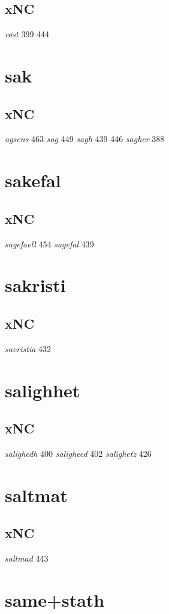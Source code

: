 \documentclass[a4paper,twocolumn]{article}
\begin{document}
\subsection{xNC}
\label{sec:org9426e8e}
\emph{røst} 399 444 
\section{sak}
\label{sec:org3487ff0}
\subsection{xNC}
\label{sec:org9a9e229}
\emph{agsens} 463 \emph{sag} 449 \emph{sagh} 439 446 \emph{sagher} 388 
\section{sakefal}
\label{sec:org0ee5bb6}
\subsection{xNC}
\label{sec:org17df959}
\emph{sagefaell} 454 \emph{sagefal} 439 
\section{sakristi}
\label{sec:orgb8181f1}
\subsection{xNC}
\label{sec:org04c0c45}
\emph{sacristia} 432 
\section{salighhet}
\label{sec:org75b4f63}
\subsection{xNC}
\label{sec:orgb7a5487}
\emph{salighedh} 400 \emph{saligheed} 402 \emph{salighetz} 426 
\section{saltmat}
\label{sec:org572393f}
\subsection{xNC}
\label{sec:org6d49c8c}
\emph{saltmad} 443 
\section{same+stath}
\label{sec:orge3fd7a3}
\end{document}
